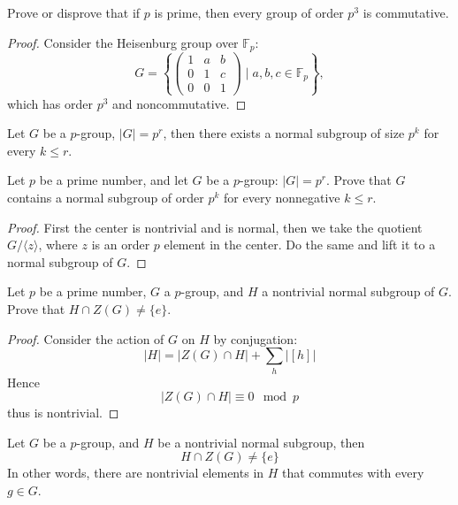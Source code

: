 \documentclass[openany]{book}
\newcommand{\F}{\mathbb{F}}
\newcommand{\la}{\langle}
\newcommand{\ra}{\rangle}
\begin{document}
\begin{prob}
Prove or disprove that if $p$ is prime, then every group of order $p^3$ is commutative.
\end{prob}
\begin{proof}
    Consider the Heisenburg group over $\F_p$:
    \[
G = \left\{
\begin{pmatrix}
1 & a & b \\
0 & 1 & c \\
0 & 0 & 1
\end{pmatrix}
\;\Bigg|\; a, b, c \in \mathbb{F}_p
\right\},
\]
which has order $p^3$ and noncommutative.
\end{proof}


\begin{prop}
    Let $G$ be a $p$-group, $|G|=p^r$, then there exists a normal subgroup of size $p^k$ for every $k\leq r$.
\end{prop}

\begin{prob}
  Let $p$ be a prime number, and let $G$ be a $p$-group: $|G| = p^r$. Prove that $G$ contains a normal subgroup of order $p^k$ for every nonnegative $k \leq r$.
\end{prob}
\begin{proof}
    First the center is nontrivial and is normal, then we take the quotient $G/\la z\ra$, where $z$ is an order $p$ element in the center. Do the same and lift it to a normal subgroup of $G$.
\end{proof}

\begin{prob}
  Let $p$ be a prime number, $G$ a $p$-group, and $H$ a nontrivial normal subgroup of $G$. Prove that $H \cap Z(G) \neq \{e\}$.
\end{prob}
\begin{proof}
    Consider the action of $G$ on $H$ by conjugation:
    \begin{equation*}
        |H|=|Z(G)\cap H|+\sum_h|[h]|
    \end{equation*}
    Hence 
    \begin{equation*}
        |Z(G)\cap H|\equiv 0\mod p
    \end{equation*}
    thus is nontrivial.
\end{proof}

\begin{prop}
    Let $G$ be a $p$-group, and $H$ be a nontrivial normal subgroup, then 
    \begin{equation*}
        H\cap Z(G)\neq\{e\}
    \end{equation*}
    In other words, there are nontrivial elements in $H$ that commutes with every $g\in G$.
\end{prop}
\end{document}
